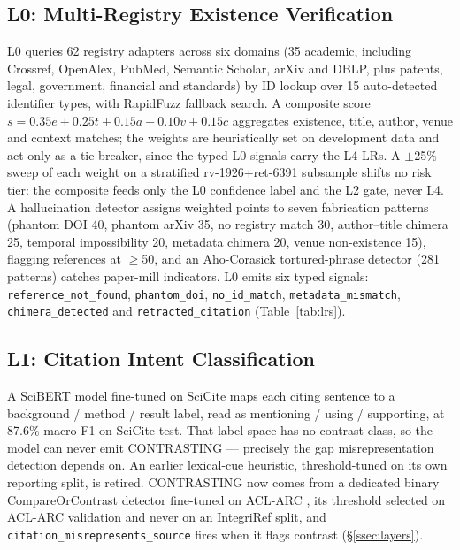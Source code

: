 \documentclass[runningheads]{llncs}
\begin{document}
\subsection{L0: Multi-Registry Existence Verification}

L0 queries 62 registry adapters across six domains (35 academic, including Crossref, OpenAlex, PubMed, Semantic Scholar, arXiv and DBLP, plus patents, legal, government, financial and standards) by ID lookup over 15 auto-detected identifier types, with RapidFuzz fallback search. A composite score $s = 0.35e + 0.25t + 0.15a + 0.10v + 0.15c$ aggregates existence, title, author, venue and context matches; the weights are heuristically set on development data and act only as a tie-breaker, since the typed L0 signals carry the L4 LRs. A $\pm$25\% sweep of each weight on a stratified rv-1926+ret-6391 subsample shifts no risk tier: the composite feeds only the L0 confidence label and the L2 gate, never L4. A hallucination detector assigns weighted points to seven fabrication patterns (phantom DOI 40, phantom arXiv 35, no registry match 30, author--title chimera 25, temporal impossibility 20, metadata chimera 20, venue non-existence 15), flagging references at $\geq$50, and an Aho-Corasick tortured-phrase detector (281 patterns) catches paper-mill indicators. L0 emits six typed signals: \texttt{reference\_not\_found}, \texttt{phantom\_doi}, \texttt{no\_id\_match}, \texttt{metadata\_mismatch}, \texttt{chimera\_detected} and \texttt{retracted\_citation} (Table~\ref{tab:lrs}).

\subsection{L1: Citation Intent Classification}

A SciBERT model fine-tuned on SciCite \cite{cohan2019structural} maps each citing sentence to a background / method / result label, read as mentioning / using / supporting, at 87.6\% macro F1 on SciCite test. That label space has no contrast class, so the model can never emit CONTRASTING --- precisely the gap misrepresentation detection depends on. An earlier lexical-cue heuristic, threshold-tuned on its own reporting split, is retired. CONTRASTING now comes from a dedicated binary CompareOrContrast detector fine-tuned on ACL-ARC \cite{jurgens2018measuring}, its threshold selected on ACL-ARC validation and never on an IntegriRef split, and \texttt{citation\_\allowbreak misrepresents\_\allowbreak source} fires when it flags contrast (\S\ref{ssec:layers}).
\end{document}
